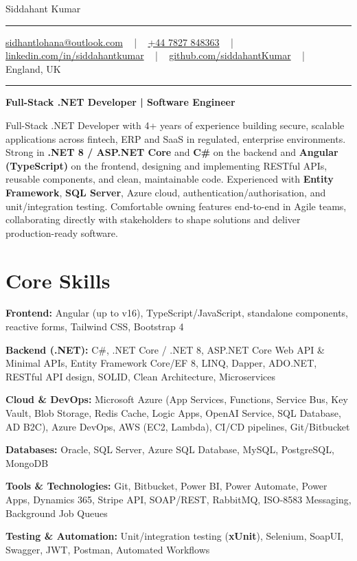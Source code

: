 \documentclass[letterpaper,10pt]{article}
\newcommand{\documentTitle}[2]{
  \begin{center}
    \vspace*{-0.3in}
    {\Huge\color{accentTitle} #1}
    \vspace{8pt}
    {\color{accentLine} \hrule}
    \vspace{2pt}
    \footnotesize{#2}
    \vspace{2pt}
    {\color{accentLine} \hrule}
  \end{center}
}
\newenvironment{resume_list}{
  \vspace{-7pt}
  \begin{itemize}[itemsep=-2px, parsep=1pt, leftmargin=30pt]
}{
  \end{itemize}
}
\begin{document}
\documentTitle{Siddahant Kumar}{
\vspace{0.1cm}
\href{mailto:sidhantlohana@outlook.com}{sidhantlohana@outlook.com} ~ | ~
\href{tel:+447827848363}{+44 7827 848363} ~ | ~
\href{https://www.linkedin.com/in/siddahantkumar/}{linkedin.com/in/siddahantkumar} ~ | ~
\href{https://github.com/siddahantKumar}{github.com/siddahantKumar} ~ | ~
England, UK
}

\begin{center}
\textbf{Full-Stack .NET Developer | Software Engineer}
\end{center}

Full-Stack .NET Developer with 4+ years of experience building secure, scalable applications across fintech, ERP and SaaS in regulated, enterprise environments. Strong in \textbf{.NET 8 / ASP.NET Core} and \textbf{C\#} on the backend and \textbf{Angular (TypeScript)} on the frontend, designing and implementing RESTful APIs, reusable components, and clean, maintainable code. Experienced with \textbf{Entity Framework}, \textbf{SQL Server}, Azure cloud, authentication/authorisation, and unit/integration testing. Comfortable owning features end-to-end in Agile teams, collaborating directly with stakeholders to shape solutions and deliver production-ready software.


\section{Core Skills}

\begin{resume_list}
    \item \textbf{Frontend:} Angular (up to v16), TypeScript/JavaScript, standalone components, reactive forms, Tailwind CSS, Bootstrap 4
    \item \textbf{Backend (.NET):} C\#, .NET Core / .NET 8, ASP.NET Core Web API \& Minimal APIs, Entity Framework Core/EF 8, LINQ, Dapper, ADO.NET, RESTful API design, SOLID, Clean Architecture, Microservices
    \item \textbf{Cloud \& DevOps:} Microsoft Azure (App Services, Functions, Service Bus, Key Vault, Blob Storage, Redis Cache, Logic Apps, OpenAI Service, SQL Database, AD B2C), Azure DevOps, AWS (EC2, Lambda), CI/CD pipelines, Git/Bitbucket
    \item \textbf{Databases:} Oracle, SQL Server, Azure SQL Database, MySQL, PostgreSQL, MongoDB
    \item \textbf{Tools \& Technologies:} Git, Bitbucket, Power BI, Power Automate, Power Apps, Dynamics 365, Stripe API, SOAP/REST, RabbitMQ, ISO-8583 Messaging, Background Job Queues
    \item \textbf{Testing \& Automation:} Unit/integration testing (\textbf{xUnit}), Selenium, SoapUI, Swagger, JWT, Postman, Automated Workflows
\end{resume_list}
\end{document}
